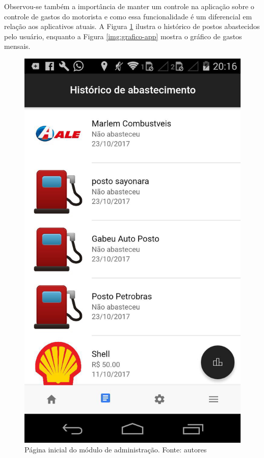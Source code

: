 Observou-se também a importância de manter um controle na aplicação sobre o controle de gastos do motorista e como essa funcionalidade é um diferencial em relação aos aplicativos atuais. A Figura \ref{img:historico-app} ilustra o histórico de postos abastecidos pelo usuário, enquanto a Figura \ref{img:grafico-app} mostra o gráfico de gastos mensais.

\begin{figure}[H]
    \centering
    \includegraphics[scale=0.2]{figuras/historico-app.jpg}
    \caption[Página inicial do módulo de administração]{Página inicial do módulo de administração. Fonte: autores}
    \label{img:historico-app}
\end{figure}

